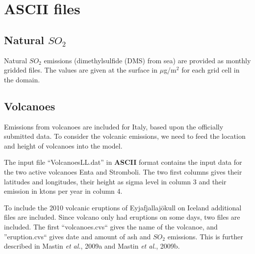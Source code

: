 \section{ASCII files}


% 
% 
% 
% 



\subsection{Natural $SO_2$}
Natural $SO_2$ emissions (dimethylsulfide (DMS) from sea) are provided 
as monthly gridded files.  
The values are given at the surface in $\mu$g/m$^2$ for each grid cell in the domain. 

\subsection{Volcanoes}

Emissions from volcanoes are included for Italy, based upon the
officially submitted data.
To consider the volcanic emissions, we need to feed the location
and height of volcanoes into the model. 

The input file ``VolcanoesLL.dat'' in {\bf ASCII} format contains the input data for the two active volcanoes
 Enta and Stromboli. The two first columns gives their latitudes and longitudes, their height as sigma level
 in column 3 and their emission in ktons per year in column 4. 

To include the 2010 volcanic eruptions of Eyjafjallaj\"{o}kull on Iceland additional files are included. 
Since volcano only had eruptions on some days, two files are included. The first ``volcanoes.cvs`` gives 
the name of the volcanoe, and ''eruption.cvs`` gives date and amount of ash and $SO_2$ emissions. 
This is further described in Mastin {\sl et al.}, 2009a and Mastin {\sl et al.}, 2009b.


